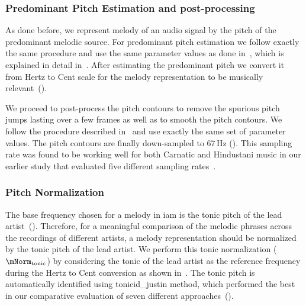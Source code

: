 \subsubsection{Predominant Pitch Estimation and post-processing}
\label{sec:patterns_improving_similarity_melody_estimation}

As done before, we represent melody of an audio signal by the pitch of the predominant melodic source. For predominant pitch estimation we follow exactly the same procedure and use the same parameter values as done in~, which is explained in detail in~. After estimating the predominant pitch we convert it from Hertz to Cent scale for the melody representation to be musically relevant~().

We proceed to post-process the pitch contours to remove the spurious pitch jumps lasting over a few frames as well as to smooth the pitch contours. We follow the procedure described in~ and use exactly the same set of parameter values. The pitch contours are finally down-sampled to 67\,Hz (). This sampling rate was found to be working well for both Carnatic and Hindustani music in our earlier study that evaluated five different sampling rates~.


\subsubsection{Pitch Normalization}
\label{sec:patterns_improving_similarity_transposition_invariance}

The base frequency chosen for a melody in \gls{iam} is the tonic pitch of the lead artist~(). Therefore, for a meaningful comparison of the melodic phrases across the recordings of different artists, a melody representation should be normalized by the tonic pitch of the lead artist. We perform this tonic normalization ($\mNorm_\mathrm{tonic}$) by considering the tonic of the lead artist as the reference frequency during the Hertz to Cent conversion as shown in~. The tonic pitch is automatically identified using \acrshort{tonicid_justin} method, which performed the best in our comparative evaluation of seven different approaches~().

